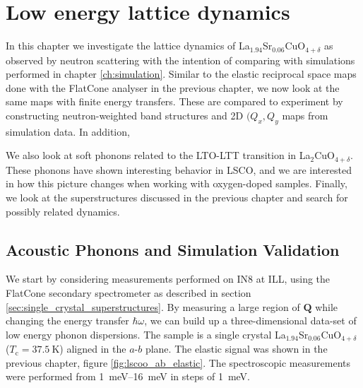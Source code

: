 \chapter{Low energy lattice dynamics}\label{ch:lowen}
In this chapter we investigate the lattice dynamics of La$_{1.94}$Sr$_{0.06}$CuO$_{4+\delta}$ as observed by neutron scattering with the intention of comparing with simulations performed in chapter \ref{ch:simulation}. Similar to the elastic reciprocal space maps done with the FlatCone analyser in the previous chapter, we now look at the same maps with finite energy transfers. These are compared to experiment by constructing neutron-weighted band structures and 2D $(Q_x,Q_y$ maps from simulation data. In addition, 

We also look at soft phonons related to the LTO-LTT transition in La$_2$CuO$_{4+\delta}$. These phonons have shown interesting behavior in LSCO, and we are interested in how this picture changes when working with oxygen-doped samples. Finally, we look at the superstructures discussed in the previous chapter and search for possibly related dynamics.

\section{Acoustic Phonons and Simulation Validation}
We start by considering measurements performed on IN8 at ILL, using the FlatCone secondary spectrometer as described in section \ref{sec:single_crystal_superstructures}. By measuring a large region of $\bm{Q}$ while changing the energy transfer $\hbar\omega$, we can build up a three-dimensional data-set of low energy phonon dispersions. The sample is a single crystal La$_{1.94}$Sr$_{0.06}$CuO$_{4+\delta}$ ($T_\text{c} = \SI{37.5}{\kelvin}$) aligned in the $a$-$b$ plane. The elastic signal was shown in the previous chapter, figure \ref{fig:lscoo_ab_elastic}. The spectroscopic measurements were performed from \SIrange{1}{16}{\milli\eV} in steps of \SI{1}{\milli\eV}.

